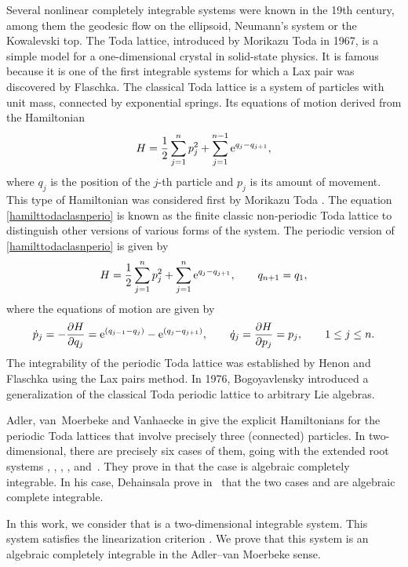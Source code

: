 \documentclass[10pt,a4paper]{amsart}
\numberwithin{equation}{section}
\begin{document}
Several nonlinear completely integrable systems were known in the
19th century, among them the geodesic flow on the ellipsoid,
Neumann's system or the Kowalevski top. The Toda lattice, introduced
by Morikazu Toda in 1967, is a simple model for a one-dimensional
crystal in solid-state physics. It is famous because it is one of
the first integrable systems for which a Lax pair was discovered by
Flaschka. The classical Toda lattice is a system of particles with
unit mass, connected by exponential springs. Its equations of motion derived from the Hamiltonian
\begin{equation}
 H=\frac{1}{2}\sum_{j=1}^n p_j^2+ \sum_{j=1}^{n-1}
 {\rm e}^{q_j-q_{j+1}}, \label{hamilttodaclasnperio}
\end{equation}
where $q_j$ is the position of the $j$-th particle and
$p_j$ is its amount of movement. This type of Hamiltonian was
considered first by Morikazu Toda \cite{toda,toda1}. The equation
\eqref{hamilttodaclasnperio} is known as the finite classic non-periodic Toda lattice to distinguish other versions of various forms
of the system. The periodic version of \eqref{hamilttodaclasnperio}
is given by
\[H=\frac{1}{2}\sum_{j=1}^n p_j^2+ \sum_{j=1}^n {\rm e}^{q_j-q_{j+1}}, \qquad q_{n+1} =q_1,\]
 where the equations of motion are given by
\[
\dot{p}_j=-\frac{\partial H}{\partial q_j}=
{\rm e}^{(q_{j-1}-q_j)}-{\rm e}^{(q_j-q_{j+1})},\qquad \dot{q}_j=\frac{\partial H }{\partial p_j}=p_j, \qquad 1\leq j\leq n.
\]
The integrability of the periodic Toda lattice was established by
Henon \cite{henon} and Flaschka \cite{flaschka} using the Lax pairs
method. In 1976, Bogoyavlensky \cite{bogoya} introduced a
generalization of the classical Toda periodic lattice to arbitrary
Lie algebras.

 Adler, van~Moerbeke and Vanhaecke in \cite{al_Moer3} give the explicit
Hamiltonians for the periodic Toda lattices that involve precisely
three (connected) particles. In two-dimensional, there are precisely six cases of them, going with the extended root systems
, ,
, ,
 and~. They prove in \cite{al_Moer5,al_Moer3}
that the case  is algebraic completely integrable. In his case, Dehainsala prove in~\cite{Dehainsala} that the two cases  and  are algebraic complete integrable.

In this work, we consider that  is a
two-dimensional integrable system. This system satisfies the
linearization criterion \cite[Theorem 6.41]{al_Moer3}. We prove
that this system is an algebraic completely integrable in the
Adler--van Moerbeke sense.
\end{document}
